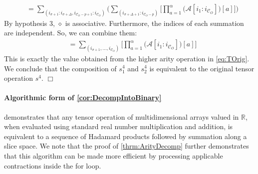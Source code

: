 \documentclass{article}
\theoremstyle{plain}
\theoremstyle{definition}
\theoremstyle{remark}
\newcommand{\cC}{\mathcal{C}}
\newcommand{\cA}{\mathcal{A}}
\let\oldparagraph\paragraph
\renewcommand{\paragraph}[1]{%
	\vspace{-0.5em}%
	\oldparagraph{#1}%
}
\begin{document}
\begin{equation*}
	\begin{aligned}
		&= \sum_{(i_{\sigma + 1} : i_{\sigma + \Delta}, i_{\cC_O - p + 1} : i_{\cC_O})} \Bigg(  \sum_{(i_{\sigma + \Delta + 1} : i_{\cC_O - p})} \Bigg[ \prod_{a=1}^{\alpha} \big(\cA[i_1 : i_{\cC_O}] \big)[a] \Bigg] \Bigg)
	\end{aligned}
\end{equation*}
By hypothesis 3, $\diamond$ is associative. Furthermore, the indices of each summation are independent. So, we can combine them:
\begin{equation*}
	\begin{aligned}
		&= \sum_{(i_{\sigma + 1},..., i_{\cC_O})} \Bigg[ \prod_{a=1}^{\alpha} \big(\cA[i_1 : i_{\cC_O}] \big)[a] \Bigg]
	\end{aligned}
\end{equation*}
This is exactly the value obtained from the higher arity operation in \cref{eq:TOrig}. We conclude that the composition of $s^4_1$ and $s^4_2$ is equivalent to the original tensor operation $s^4$.
\null\hfill $\Box$
\paragraph{Algorithmic form of \cref{cor:DecompIntoBinary}}  demonstrates that any tensor operation of multidimensional arrays valued in $\mathbb{R}$, when evaluated using standard real number multiplication and addition, is equivalent to a sequence of Hadamard products followed by summation along a slice space. We note that the proof of \cref{thrm:ArityDecomp} further demonstrates that this algorithm can be made more efficient by processing applicable contractions inside the for loop.
\end{document}
